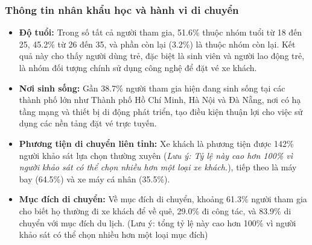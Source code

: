 \subsubsection{Thông tin nhân khẩu học và hành vi di chuyển}
\begin{itemize}
    \item \textbf{Độ tuổi:} Trong số tất cả người tham gia, 51.6\% thuộc nhóm tuổi từ 18 đến 25, 45.2\% từ 26 đến 35, và phần còn lại (3.2\%) là thuộc nhóm còn lại. Kết quả này cho thấy người dùng trẻ, đặc biệt là sinh viên và người lao động trẻ, là nhóm đối tượng chính sử dụng công nghệ để đặt vé xe khách.
    \item \textbf{Nơi sinh sống:} Gần 38.7\% người tham gia hiện đang sinh sống tại các thành phố lớn như Thành phố Hồ Chí Minh, Hà Nội và Đà Nẵng, nơi có hạ tầng mạng và thiết bị di động phát triển, tạo điều kiện thuận lợi cho việc sử dụng các nền tảng đặt vé trực tuyến.
    \item \textbf{Phương tiện di chuyển liên tỉnh:} Xe khách là phương tiện được 142\% người khảo sát lựa chọn thường xuyên (\textit{Lưu ý: Tỷ lệ này cao hơn 100\% vì người khảo sát có thể chọn nhiều hơn một loại xe khách.}), tiếp theo là máy bay (64.5\%) và xe máy cá nhân (35.5\%).
    \item \textbf{Mục đích di chuyển:} Về mục đích di chuyển, khoảng 61.3\% người tham gia cho biết họ thường đi xe khách để về quê, 29.0\% đi công tác, và 83.9\% di chuyển với mục đích du lịch. (Lưu ý: tổng tỷ lệ này cao hơn 100\% vì người khảo sát có thể chọn nhiều hơn một loại mục đích)
\end{itemize}
